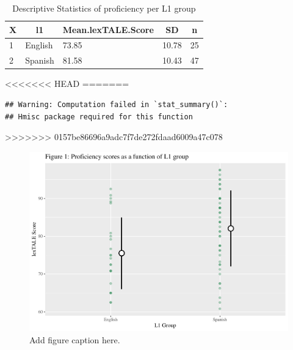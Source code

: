 \documentclass[
  english,
  man]{apa6}
\begin{document}
\begin{table}[tbp]

\begin{center}
\begin{threeparttable}

\caption{\label{tab:unnamed-chunk-1}Descriptive Statistics of proficiency per L1 group}

\begin{tabular}{lllll}
\toprule
X & \multicolumn{1}{c}{l1} & \multicolumn{1}{c}{Mean.lexTALE.Score} & \multicolumn{1}{c}{SD} & \multicolumn{1}{c}{n}\\
\midrule
1 & English & 73.85 & 10.78 & 25\\
2 & Spanish & 81.58 & 10.43 & 47\\
\bottomrule
\end{tabular}

\end{threeparttable}
\end{center}

\end{table}

<<<<<<< HEAD
=======
\begin{verbatim}
## Warning: Computation failed in `stat_summary()`:
## Hmisc package required for this function
\end{verbatim}

>>>>>>> 0157be86696a9adc7f7de272fdaad6009a47c078
\begin{figure}
\includegraphics[width=1950px]{master_files/figure-latex/unnamed-chunk-2-1} \caption{Add figure caption here.}\label{fig:unnamed-chunk-2}
\end{figure}
\end{document}
